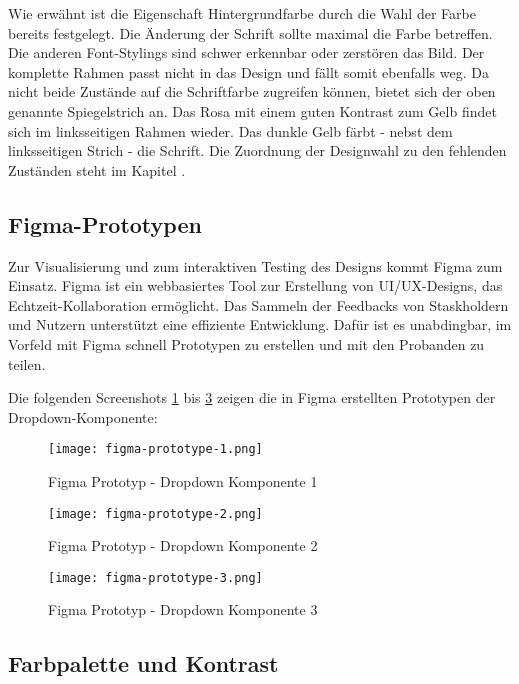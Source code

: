 Wie erwähnt ist die Eigenschaft Hintergrundfarbe durch die Wahl der Farbe bereits festgelegt. 
Die Änderung der Schrift sollte maximal die Farbe betreffen. 
Die anderen Font-Stylings sind schwer erkennbar oder zerstören das Bild.
Der komplette Rahmen passt nicht in das Design und fällt somit ebenfalls weg.
Da nicht beide Zustände auf die Schriftfarbe zugreifen können, bietet sich der oben genannte Spiegelstrich an.
Das Rosa mit einem guten Kontrast zum Gelb findet sich im linksseitigen Rahmen wieder.
Das dunkle Gelb färbt - nebst dem linksseitigen Strich - die Schrift.
Die Zuordnung der Designwahl zu den fehlenden Zuständen steht im Kapitel \textbf{}.


\clearpage
\subsection{Figma-Prototypen}
\label{sec:figmaPrototype}

Zur Visualisierung und zum interaktiven Testing des Designs kommt Figma zum Einsatz. 
Figma ist ein webbasiertes Tool zur Erstellung von UI/UX-Designs, das Echtzeit-Kollaboration ermöglicht. 
Das Sammeln der Feedbacks von Staskholdern und Nutzern unterstützt eine effiziente Entwicklung.
Dafür ist es unabdingbar, im Vorfeld mit Figma schnell Prototypen zu erstellen und mit den Probanden zu teilen.

Die folgenden Screenshots \ref{img:figmaPrototype1} bis \ref{img:figmaPrototype3} zeigen die in Figma erstellten Prototypen der Dropdown-Komponente:

\begin{figure}[!htb]
    \centering
    \texttt{[image: figma-prototype-1.png]}
    \caption{Figma Prototyp - Dropdown Komponente 1}
    \label{img:figmaPrototype1}
\end{figure}

\begin{figure}[!htb]
    \centering
    \texttt{[image: figma-prototype-2.png]}
    \caption{Figma Prototyp - Dropdown Komponente 2}
    \label{img:figmaPrototype2}
\end{figure}

\begin{figure}[!htb]
    \centering
    \texttt{[image: figma-prototype-3.png]}
    \caption{Figma Prototyp - Dropdown Komponente 3}
    \label{img:figmaPrototype3}
\end{figure}


\subsection{Farbpalette und Kontrast}
\label{sec:colorContrast}

